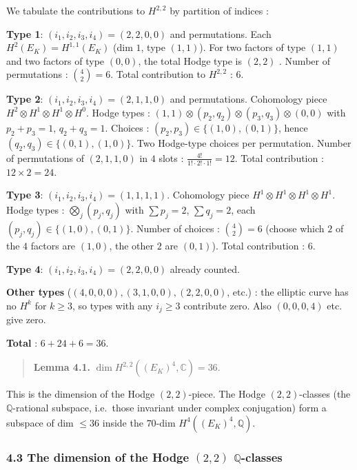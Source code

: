 \documentclass[
  11pt,
  a4paper,
]{amsart}
\begin{document}
We tabulate the contributions to \(H^{2,2}\) by partition of indices :

\textbf{Type 1}: \((i_1, i_2, i_3, i_4) = (2, 2, 0, 0)\) and permutations. Each \(H^{2}(E_K) = H^{1,1}(E_K)\) (dim \(1\), type \((1,1)\)). For two factors of type \((1,1)\) and two factors of type \((0,0)\), the total Hodge type is \((2, 2)\) . Number of permutations : \(\binom{4}{2} = 6\). Total contribution to \(H^{2,2}\) : \(6\).

\textbf{Type 2}: \((i_1, i_2, i_3, i_4) = (2, 1, 1, 0)\) and permutations. Cohomology piece \(H^2 \otimes H^1 \otimes H^1 \otimes H^0\). Hodge types : \((1,1) \otimes (p_2, q_2) \otimes (p_3, q_3) \otimes (0, 0)\) with \(p_2 + p_3 = 1\), \(q_2 + q_3 = 1\). Choices : \((p_2, p_3) \in \{(1, 0), (0, 1)\}\), hence \((q_2, q_3) \in \{(0, 1), (1, 0)\}\). Two Hodge-type choices per permutation. Number of permutations of \((2, 1, 1, 0)\) in \(4\) slots : \(\frac{4!}{1!\cdot 2!\cdot 1!} = 12\). Total contribution : \(12 \times 2 = 24\).

\textbf{Type 3}: \((i_1, i_2, i_3, i_4) = (1, 1, 1, 1)\). Cohomology piece \(H^1 \otimes H^1 \otimes H^1 \otimes H^1\). Hodge types : \(\bigotimes_j (p_j, q_j)\) with \(\sum p_j = 2\), \(\sum q_j = 2\), each \((p_j, q_j) \in \{(1, 0), (0, 1)\}\). Number of choices : \(\binom{4}{2} = 6\) (choose which \(2\) of the \(4\) factors are \((1, 0)\), the other \(2\) are \((0, 1)\)). Total contribution : \(6\).

\textbf{Type 4}: \((i_1, i_2, i_3, i_4) = (2, 2, 0, 0)\) already counted.

\textbf{Other types} (\((4, 0, 0, 0), (3, 1, 0, 0), (2, 2, 0, 0)\), etc.) : the elliptic curve has no \(H^k\) for \(k \geq 3\), so types with any \(i_j \geq 3\) contribute zero. Also \((0, 0, 0, 4)\) etc. give zero.

\textbf{Total} : \(6 + 24 + 6 = 36\).

\begin{quote}
\textbf{Lemma 4.1.} \(\dim H^{2,2}((E_K)^4, \mathbb{C}) = 36\).
\end{quote}

This is the dimension of the Hodge \((2,2)\)-piece. The Hodge \((2,2)\)-classes (the \(\mathbb{Q}\)-rational subspace, i.e.~those invariant under complex conjugation) form a subspace of dim \(\leq 36\) inside the \(70\)-dim \(H^4((E_K)^4, \mathbb{Q})\).

\hypertarget{the-dimension-of-the-hodge-22-mathbbq-classes}{%
\subsubsection{\texorpdfstring{4.3 The dimension of the Hodge \((2,2)\) \(\mathbb{Q}\)-classes}{4.3 The dimension of the Hodge (2,2) \textbackslash mathbb\{Q\}-classes}}\label{the-dimension-of-the-hodge-22-mathbbq-classes}}
\end{document}

